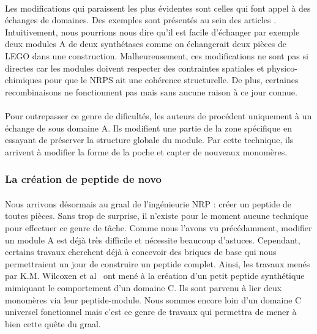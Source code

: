 \documentclass[12pt,french,twoside]{report}
\begin{document}
\paragraph{}Les modifications qui paraissent les plus évidentes sont celles qui font appel à des échanges de domaines.
Des exemples sont présentés au sein des articles \cite{cane_harnessing_1998,kim_reinvigorating_2015}.
Intuitivement, nous pourrions nous dire qu'il est facile d'échanger par exemple deux modules A de deux synthétases comme on échangerait deux pièces de LEGO dans une construction.
Malheureusement, ces modifications ne sont pas si directes car les modules doivent respecter des contraintes spatiales et physico-chimiques pour que le NRPS ait une cohérence structurelle.
De plus, certaines recombinaisons ne fonctionnent pas mais sans aucune raison à ce jour connue.


\paragraph{}Pour outrepasser ce genre de dificultés, les auteurs de \cite{kries_subdomain_2015} procédent uniquement à un échange de sous domaine A.
Ils modifient une partie de la zone spécifique en essayant de préserver la structure globale du module.
Par cette technique, ils arrivent à modifier la forme de la poche et capter de nouveaux monomères.


\subsubsection{La création de peptide de novo}

\paragraph{}Nous arrivons désormais au graal de l'ingénieurie NRP : créer un peptide de toutes pièces.
Sans trop de surprise, il n'existe pour le moment aucune technique pour effectuer ce genre de tâche.
Comme nous l'avons vu précédamment, modifier un module A est déjà très difficile et nécessite beaucoup d'astuces.
Cependant, certains travaux cherchent déjà à concevoir des briques de base qui nous permettraient un jour de construire un peptide complet.
Ainsi, les travaux menés par K.M. Wilcoxen et al~\cite{wilcoxen_biomimetic_2007} ont mené à la création d'un petit peptide synthétique mimiquant le comportement d'un domaine C.
Ils sont parvenu à lier deux monomères via leur peptide-module.
Nous sommes encore loin d'un domaine C universel fonctionnel mais c'est ce genre de travaux qui permettra de mener à bien cette quête du graal.
\end{document}
